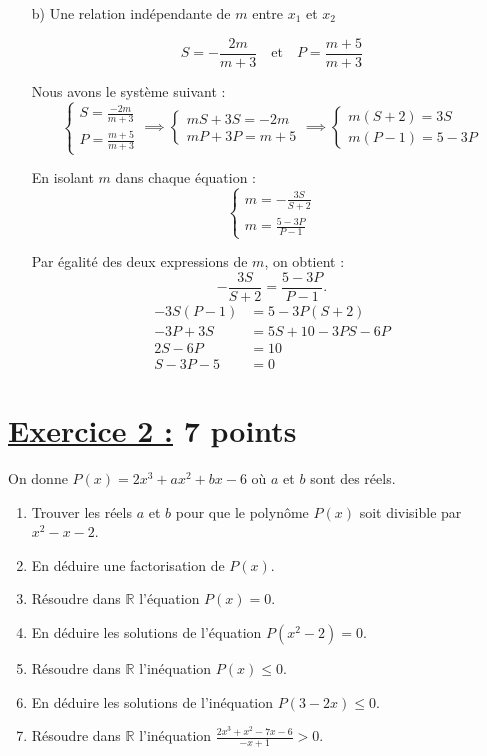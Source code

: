 \documentclass[12pt,a4paper]{article}
\begin{document}
\begin{enumerate}
\item[b)] Une relation indépendante de $m$ entre $x_1$ et $x_2$

\[
S = -\frac{2m}{m+3} \quad \text{et} \quad P = \frac{m+5}{m+3}
\]

Nous avons le système suivant :
\[
\begin{cases}
S=\frac{-2m}{m+3} \\
P=\frac{m+5}{m+3}
\end{cases} \implies 
\begin{cases}
mS + 3S = -2m \\
mP + 3P = m+5
\end{cases}\implies
\begin{cases}
m(S + 2) = 3S \\
m(P - 1) = 5 - 3P
\end{cases}
\]

En isolant $m$ dans chaque équation :
\[
\begin{cases}
m = -\frac{3S}{S + 2} \\
m = \frac{5 - 3P}{P - 1}
\end{cases}
\]

Par égalité des deux expressions de $m$, on obtient :
\[
-\frac{3S}{S + 2} = \frac{5 - 3P}{P - 1}.
\]
\[
\begin{aligned}
  -3S(P-1) &= 5 - 3P(S+2) \\
  -3P + 3S &= 5S + 10 - 3PS - 6P \\
  2S - 6P &= 10 \\
  S - 3P -5&= 0
\end{aligned}
\]
\begin{center}
\textcolor{green}{}
\end{center}
\end{enumerate}

\section*{\underline{Exercice 2 :} 7 points}
On donne \( P(x) = 2x^3 + ax^2 + bx - 6 \) où \( a \) et \( b \) sont des réels.
\begin{enumerate}
    \item Trouver les réels \( a \) et \( b \) pour que le polynôme \( P(x) \) soit divisible par \( x^2 - x - 2 \).
    \item En déduire une factorisation de \( P(x) \).
    \item Résoudre dans \( \mathbb{R} \) l'équation \( P(x) = 0 \).
    \item En déduire les solutions de l'équation \( P(x^2 - 2) = 0 \).
    \item Résoudre dans \( \mathbb{R} \) l'inéquation \( P(x) \leq 0 \).
    \item En déduire les solutions de l'inéquation \( P(3 - 2x) \leq 0 \).
    \item Résoudre dans \( \mathbb{R} \) l'inéquation \( \frac{2x^3 + x^2 - 7x - 6}{-x + 1} > 0 \).
\end{enumerate}
\end{document}
